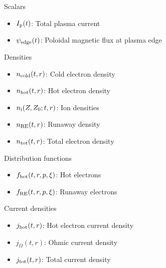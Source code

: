 \documentclass[titleunderline,widescreen1610]{chalmerspresentation}
\newcommand{\DREAM}{\textsc{Dream}}
\newcommand{\fhot}{f_{\rm hot}}
\newcommand{\fre}{f_{\rm RE}}
\newcommand{\Ip}{I_{\rm p}}
\newcommand{\ncold}{n_{\rm cold}}
\newcommand{\nhot}{n_{\rm hot}}
\newcommand{\ions}{n_{\rm i}}
\newcommand{\nre}{n_{\rm RE}}
\newcommand{\ntot}{n_{\rm tot}}
\newcommand{\jhot}{j_{\rm hot}}
\newcommand{\johm}{j_{\Omega}}
\newcommand{\jtot}{j_{\rm tot}}
\newcommand{\psiedge}{\psi_{\rm edge}}
\begin{document}
    \begin{frame}%
        \begin{minipage}{0.48\textwidth}%
            \begin{block}{Scalars}
                \begin{itemize}
                    \item $\Ip(t)$: Total plasma current
                    \item $\psiedge(t)$: Poloidal magnetic flux at plasma edge
                \end{itemize}
            \end{block}
            \begin{block}{Densities}
                \begin{itemize}
                    \item $\ncold(t,r)$: Cold electron density
                    \item $\nhot(t,r)$: Hot electron density
                    \item $\ions(Z,Z_0;t,r)$: Ion densities
                    \item $\nre(t,r)$: Runaway density
                    \item $\ntot(t,r)$: Total electron density
                \end{itemize}
            \end{block}
            \begin{block}{Distribution functions}
                \begin{itemize}
                    \item $\fhot(t,r,p,\xi)$: Hot electrons
                    \item $\fre(t,r,p,\xi)$: Runaway electrons
                \end{itemize}
            \end{block}
        \end{minipage}%
        \hfill%
        \begin{minipage}{0.48\textwidth}%
            \begin{block}{Current densities}
                \begin{itemize}
                    \item $\jhot(t,r)$: Hot electron current density
                    \item $\johm(t,r)$: Ohmic current density
                    \item $\jtot(t,r)$: Total current density

\end{itemize}
\end{block}
\end{minipage}
\end{frame}
\end{document}
